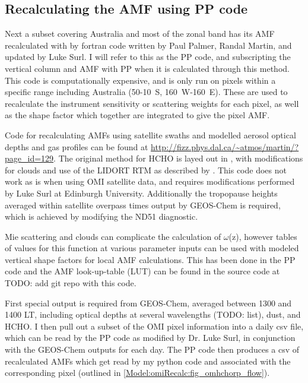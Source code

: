     
  \subsection{Recalculating the AMF using PP code}
    \label{Model:omiRecalc:ppcode}
    Next a subset covering Australia and most of the zonal band has its AMF recalculated with by fortran code written by Paul Palmer, Randal Martin, and updated by Luke Surl.
    I will refer to this as the PP code, and subscripting the vertical column and AMF with PP when it is calculated through this method.
    This code is computationally expensive, and is only run on pixels within a specific range including Australia (50-10\degr~S, 160\degr~W-160\degr~E).
    These are used to recalculate the instrument sensitivity or scattering weights for each pixel, as well as the shape factor which together are integrated to give the pixel AMF.
    
    
    Code for recalculating AMFs using satellite swaths and modelled aerosol optical depths and gas profiles can be found at \url{http://fizz.phys.dal.ca/~atmos/martin/?page_id=129}. 
    The original method for HCHO is layed out in \textcite{Palmer2001}, with modifications for clouds and use of the LIDORT RTM \parencite{Spurr2002} as described by \textcite{Martin2003}.
    This code does not work as is when using OMI satellite data, and requires modifications performed by Luke Surl at Edinburgh University.
    Additionally the tropopause heights averaged within satellite overpass times output by GEOS-Chem is required, which is achieved by modifying the ND51 diagnostic.
    
    Mie scattering and clouds can complicate the calculation of $\omega$(z), however tables of values for this function at various parameter inputs can be used with modeled vertical shape factors for local AMF calculations.
    This has been done in the PP code and the AMF look-up-table (LUT) can be found in the source code at TODO: add git repo with this code.
    
    First special output is required from GEOS-Chem, averaged between 1300 and 1400 LT, including optical depths at several wavelengths (TODO: list), dust, and HCHO.
    I then pull out a subset of the OMI pixel information into a daily csv file, which can be read by the PP code as modified by Dr. Luke Surl, in conjunction with the GEOS-Chem outputs for each day.
    The PP code then produces a csv of recalculated AMFs which get read by my python code and associated with the corresponding pixel (outlined in \ref{Model:omiRecalc:fig_omhchorp_flow}).
    
